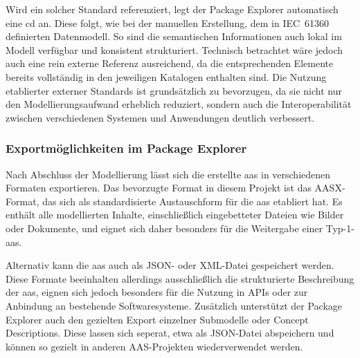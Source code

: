 Wird ein solcher Standard referenziert, legt der Package Explorer automatisch eine \acs{cd} an.
Diese folgt, wie bei der manuellen Erstellung, dem in IEC~61360 definierten Datenmodell.  
So sind die semantischen Informationen auch lokal im Modell verfügbar und konsistent strukturiert.
Technisch betrachtet wäre jedoch auch eine rein externe Referenz ausreichend, da die entsprechenden Elemente bereits vollständig in den jeweiligen Katalogen enthalten sind.
Die Nutzung etablierter externer Standards ist grundsätzlich zu bevorzugen, da sie nicht nur den Modellierungsaufwand erheblich reduziert, sondern auch die Interoperabilität zwischen verschiedenen Systemen und Anwendungen deutlich verbessert.

\subsubsection*{Exportmöglichkeiten im Package Explorer}
Nach Abschluss der Modellierung lässt sich die erstellte \acs{aas} in verschiedenen Formaten exportieren.
Das bevorzugte Format in diesem Projekt ist das AASX-Format, das sich als standardisierte Austauschform für die \acs{aas} etabliert hat.
Es enthält alle modellierten Inhalte, einschließlich eingebetteter Dateien wie Bilder oder Dokumente, und eignet sich daher besonders für die Weitergabe einer Typ-1-\acs{aas}.

Alternativ kann die \acs{aas} auch als JSON- oder XML-Datei gespeichert werden.
Diese Formate beeinhalten allerdings ausschließlich die strukturierte Beschreibung der \acs{aas}, eignen sich jedoch besonders für die Nutzung in APIs oder zur Anbindung an bestehende Softwaresysteme.
Zusätzlich unterstützt der Package Explorer auch den gezielten Export einzelner Submodelle oder Concept Descriptions.
Diese lassen sich seperat, etwa als JSON-Datei abspeichern und können so gezielt in anderen AAS-Projekten wiederverwendet werden.


